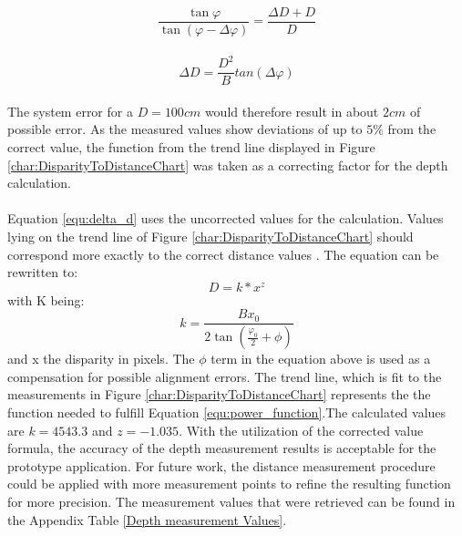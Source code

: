 \begin{equation}
\frac{\tan \varphi}{\tan(\varphi -\Delta\varphi)}=\frac{\Delta D+D}{D}
\end{equation}\\
\begin{equation}
\label{equ:delta_d}
\Delta D=\frac{D^{2}}{B} tan(\Delta\varphi)
\end{equation}
\\The system error for a $D=100cm$ would therefore result in about $2cm$ of possible error.
As the measured values show deviations of up to $5\%$ from the correct value, the function from the trend line displayed in Figure \ref{char:DisparityToDistanceChart} was taken as a correcting factor for the depth calculation.
\\\\Equation \ref{equ:delta_d} uses the uncorrected values for the calculation. Values lying on the trend line of Figure \ref{char:DisparityToDistanceChart} should correspond more exactly to the correct distance values \cite{ManafA.Mahammed.2013}. The equation can be rewritten to:
\begin{equation}
\label{equ:power_function}
D=k*x^{z}
\end{equation}
with K being:
\begin{equation}
k=\frac{Bx_0}{2\tan(\frac{\varphi_0}{2}+\phi)}
\end{equation}
and x the disparity in pixels.
The $\phi$ term in the equation above is used as a compensation for possible alignment errors.
The trend line, which is fit to the measurements in Figure \ref{char:DisparityToDistanceChart} represents the the function needed to fulfill Equation \ref{equ:power_function}.The calculated values are $k=4543.3$ and $z=-1.035$.
With the utilization of the corrected value formula, the accuracy of the depth measurement results is acceptable for the prototype application. For future work, the distance measurement procedure could be applied with more measurement points to refine the resulting function for more precision. The measurement values that were retrieved can be found in the Appendix Table \ref{Depth measurement Values}.

